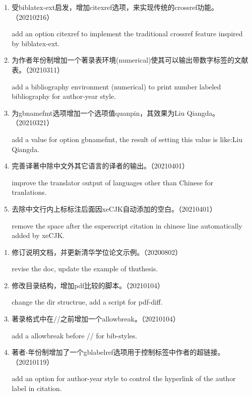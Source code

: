 \label{up:20210403}

\begin{enumerate}

\item 受biblatex-ext启发，增加citexref选项，来实现传统的crossref功能。（20210216）

add an option citexref to implement the traditional crossref feature inspired by biblatex-ext.


\item 为作者年份制增加一个著录表环境(numerical)使其可以输出带数字标签的文献表。（20210311）

add a bibliography environment (numerical) to print number labeled bibliography for author-year style.


\item 为gbnamefmt选项增加一个选项值quanpin，其效果为Liu Qiangda。（20210321）

add a value for option gbnamefmt, the result of setting this value is like:Liu Qiangda.


\item 完善译著中除中文外其它语言的译者的输出。（20210401）

improve the translator output of languages other than Chinese for tranlations.

\item 去除中文行内上标标注后面因xeCJK自动添加的空白。（20210401）

remove the space after the superscript citation in chinese line automatically added by xeCJK.
\end{enumerate}



\label{up:20210119}

\begin{enumerate}

\item 修订说明文档，并更新清华学位论文示例。（20200802）

revise the doc, update the example of thuthesis.

\item 修改目录结构，增加pdf比较的脚本。（20210104）

change the dir structrue, add a script for pdf-diff.

\item 著录格式中在//之前增加一个allowbreak。（20210104）

add a allowbreak before // for bib-styles.

\item 著者-年份制增加了一个gblabelref选项用于控制标签中作者的超链接。（20210119）

add an option for author-year style to control the hyperlink of the author label in citation.


\end{enumerate}




